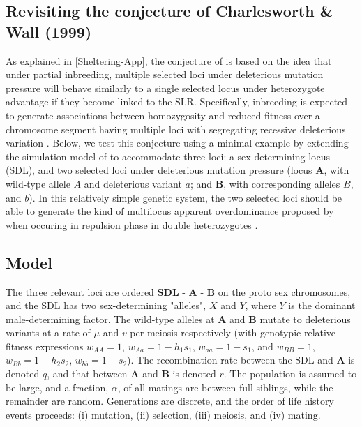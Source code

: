 \documentclass{article}
\def\mbf#1{\mathbf{#1}}
\begin{document}
\begin{appendices}
\newpage
 \section{Revisiting the conjecture of Charlesworth \& Wall (1999)} \label{CW1999-App}
 \renewcommand{\theequation}{D\arabic{equation}}
 \setcounter{equation}{0}
 \renewcommand{\thefigure}{D\arabic{figure}}
 \setcounter{figure}{0}

As explained in \ref{Sheltering-App}, the conjecture of \citet{CharlesworthWall1999} is based on the idea that under partial inbreeding, multiple selected loci under deleterious mutation pressure will behave similarly to a single selected locus under heterozygote advantage if they become linked to the SLR. Specifically, inbreeding is expected to generate associations between homozygosity and reduced fitness over a chromosome segment having multiple loci with segregating recessive deleterious variation \citep{Charlesworth1991b, Waller2021}. Below, we test this conjecture using a minimal example by extending the simulation model of \citet{CharlesworthWall1999} to accommodate three loci: a sex determining locus (SDL), and two selected loci under deleterious mutation pressure (locus $\mbf{A}$, with wild-type allele $A$ and deleterious variant $a$; and $\mbf{B}$, with corresponding alleles $B$, and $b$). In this relatively simple genetic system, the two selected loci should be able to generate the kind of multilocus apparent overdominance proposed by \citet{CharlesworthWall1999} when occuring in repulsion phase in double heterozygotes \citep{Charlesworth1991b, Waller2021}.


\subsection{Model} 

The three relevant loci are ordered $\mbf{SDL}$ - $\mbf{A}$ - $\mbf{B}$ on the proto sex chromosomes, and the SDL has two sex-determining "alleles", $X$ and $Y$, where $Y$ is the dominant male-determining factor. The wild-type alleles at $\mbf{A}$ and $\mbf{B}$ mutate to deleterious variants at a rate of $\mu$ and $v$ per meiosis respectively (with genotypic relative fitness expressions $w_{AA} = 1$, $w_{Aa} = 1 - h_1 s_1$, $w_{aa} = 1 - s_1$, and $w_{BB} = 1$, $w_{Bb} = 1 - h_2 s_2$, $w_{bb} = 1 - s_2$). The recombination rate between the SDL and $\mbf{A}$ is denoted $q$, and that between $\mbf{A}$ and $\mbf{B}$ is denoted $r$. The population is assumed to be large, and a fraction, $\alpha$, of all matings are between full siblings, while the remainder are random. Generations are discrete, and the order of life history events proceeds: (i) mutation, (ii) selection, (iii) meiosis, and (iv) mating. 


\end{appendices}
\end{document}
